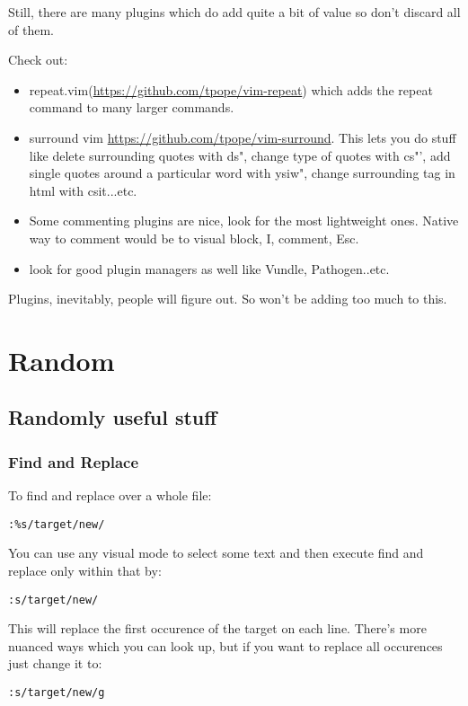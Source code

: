 \documentclass[12pt, letterpaper]{article}
\begin{document}
Still, there are many plugins which do add quite a bit of value so don't
discard all of them.

Check out: 
\begin{itemize}
    \item repeat.vim(\url{https://github.com/tpope/vim-repeat}) which adds the
        repeat command to many larger commands.
    \item surround vim \url{https://github.com/tpope/vim-surround}. This lets
        you do stuff like delete surrounding quotes with ds", change type of
        quotes with cs"', add single quotes around a particular word with
        ysiw", change surrounding tag in html with csit...etc.
    \item Some commenting plugins are nice, look for the most lightweight ones.
        Native way to comment would be to visual block, I, comment, Esc.
    \item look for good plugin managers as well like Vundle, Pathogen..etc.
\end{itemize}


Plugins, inevitably, people will figure out. So won't be adding too much to
this.


\section{Random}
\subsection{Randomly useful stuff}

\subsubsection{Find and Replace}
To find and replace over a whole file:
\begin{verbatim}
:%s/target/new/
\end{verbatim}

You can use any visual mode to select some text and then execute find and
replace only within that by:
\begin{verbatim}
:s/target/new/
\end{verbatim}
This will replace the first occurence of the target on each line. There's more
nuanced ways which you can look up, but if you want to replace all occurences
just change it to:
\begin{verbatim}
:s/target/new/g
\end{verbatim}
\end{document}

